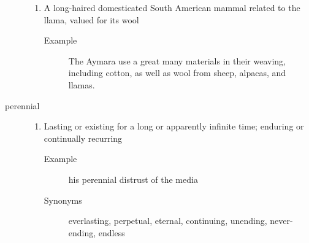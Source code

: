 \documentclass[12pt]{article}
\begin{document}
\begin{description}
\begin{enumerate}
	\item A long-haired domesticated South American mammal related to the llama, valued for its wool
		\begin{description}
		\item[Example] The Aymara use a great many materials in their weaving, including cotton, as well as wool from sheep, alpacas, and llamas.
		\end{description}
	\end{enumerate}
\item[perennial]
	\begin{enumerate}
	\item Lasting or existing for a long or apparently infinite time; enduring or continually recurring
		\begin{description}
		\item[Example] his perennial distrust of the media
		\item[Synonyms] everlasting, perpetual, eternal, continuing, unending, never-ending, endless
		\end{description}
	\end{enumerate}
\end{description}
\end{document}
